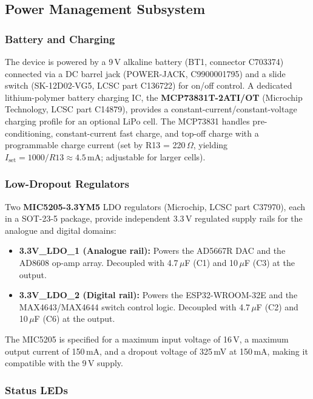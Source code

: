 \subsection{Power Management Subsystem}
\label{subsec:power}

\subsubsection{Battery and Charging}

The device is powered by a 9\,V alkaline battery (BT1, connector C703374) connected via a DC barrel jack (POWER-JACK, C9900001795) and a slide switch (SK-12D02-VG5, LCSC part C136722) for on/off control. A dedicated lithium-polymer battery charging IC, the \textbf{MCP73831T-2ATI/OT} (Microchip Technology, LCSC part C14879), provides a constant-current/constant-voltage charging profile for an optional LiPo cell.  The MCP73831 handles pre-conditioning, constant-current fast charge, and top-off charge with a programmable charge current (set by R13 = 220\,$\Omega$, yielding $I_\mathrm{set} = 1000/R13 \approx 4.5$\,mA; adjustable for larger cells).

\subsubsection{Low-Dropout Regulators}

Two \textbf{MIC5205-3.3YM5} LDO regulators (Microchip, LCSC part C37970), each in a SOT-23-5 package, provide independent 3.3\,V regulated supply rails for the analogue and digital domains:
\begin{itemize}
    \item \textbf{3.3V\_LDO\_1 (Analogue rail):} Powers the AD5667R DAC and the AD8608 op-amp array. Decoupled with 4.7\,$\mu$F (C1) and 10\,$\mu$F (C3) at the output.
    \item \textbf{3.3V\_LDO\_2 (Digital rail):} Powers the ESP32-WROOM-32E and the MAX4643/MAX4644 switch control logic. Decoupled with 4.7\,$\mu$F (C2) and 10\,$\mu$F (C6) at the output.
\end{itemize}
The MIC5205 is specified for a maximum input voltage of 16\,V, a maximum output current of 150\,mA, and a dropout voltage of 325\,mV at 150\,mA, making it compatible with the 9\,V supply.

\subsubsection{Status LEDs}

